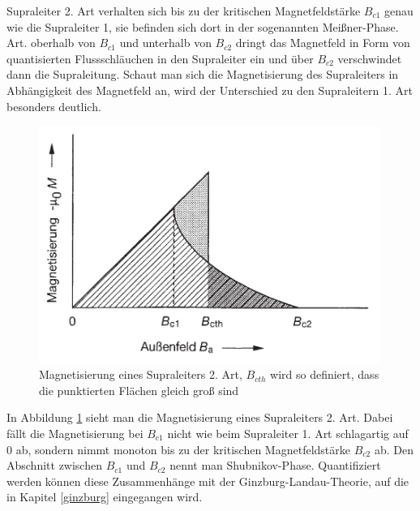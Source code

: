 Supraleiter 2. Art verhalten sich bis zu der kritischen Magnetfeldstärke $B_{c1}$ genau wie die Supraleiter 1, sie befinden sich dort in der sogenannten Meißner-Phase. Art. oberhalb von $B_{c1}$ und unterhalb von $B_{c2}$ dringt das Magnetfeld in Form von quantisierten Flussschläuchen in den Supraleiter ein und über $B_{c2}$ verschwindet dann die Supraleitung. Schaut man sich die Magnetisierung des Supraleiters in Abhängigkeit des Magnetfeld an, wird der Unterschied zu den Supraleitern 1. Art besonders deutlich.
\begin{figure}[htbp]  
     \includegraphics[width=0.99\textwidth]{2_art.png}
  \caption{Magnetisierung eines Supraleiters 2. Art, $B_{cth}$ wird so definiert, dass die punktierten Flächen gleich groß sind \cite{supraleitung}}
  \label{2.art}
\end{figure}
In Abbildung \ref{2.art} sieht man die Magnetisierung eines Supraleiters 2. Art. Dabei fällt die Magnetisierung bei $B_{c1}$ nicht wie beim Supraleiter 1. Art schlagartig auf $0$ ab, sondern nimmt monoton bis zu der kritischen Magnetfeldstärke $B_{c2}$ ab. Den Abschnitt zwischen $B_{c1}$ und $B_{c2}$ nennt man Shubnikov-Phase. Quantifiziert werden können diese Zusammenhänge mit der Ginzburg-Landau-Theorie, auf die in Kapitel \ref{ginzburg} eingegangen wird. 

